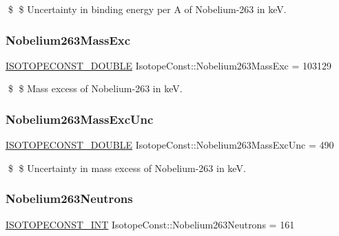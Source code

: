 \$ \$ Uncertainty in binding energy per A of Nobelium-\/263 in keV. \mbox{\label{group___isotope_const-_nobelium-_no263_ga46fcd33c52aae803cac7c14f2fa99e83}} 
\subsubsection{\texorpdfstring{Nobelium263\+Mass\+Exc}{Nobelium263MassExc}}
{\footnotesize\ttfamily \mbox{\hyperlink{group___isotope_const-_macros_ga8f45a7272ce02c0b4c65c44636ed719a}{I\+S\+O\+T\+O\+P\+E\+C\+O\+N\+S\+T\+\_\+\+D\+O\+U\+B\+LE}} Isotope\+Const\+::\+Nobelium263\+Mass\+Exc = 103129}

\$ \$ Mass excess of Nobelium-\/263 in keV. \mbox{\label{group___isotope_const-_nobelium-_no263_ga64a7565dba4a6623602af4562fa977e1}} 
\subsubsection{\texorpdfstring{Nobelium263\+Mass\+Exc\+Unc}{Nobelium263MassExcUnc}}
{\footnotesize\ttfamily \mbox{\hyperlink{group___isotope_const-_macros_ga8f45a7272ce02c0b4c65c44636ed719a}{I\+S\+O\+T\+O\+P\+E\+C\+O\+N\+S\+T\+\_\+\+D\+O\+U\+B\+LE}} Isotope\+Const\+::\+Nobelium263\+Mass\+Exc\+Unc = 490}

\$ \$ Uncertainty in mass excess of Nobelium-\/263 in keV. \mbox{\label{group___isotope_const-_nobelium-_no263_gaed4156afb538ce2c36378a25ada4008c}} 
\subsubsection{\texorpdfstring{Nobelium263\+Neutrons}{Nobelium263Neutrons}}
{\footnotesize\ttfamily \mbox{\hyperlink{group___isotope_const-_macros_ga5f18360b3e99483a35c32d789e62621c}{I\+S\+O\+T\+O\+P\+E\+C\+O\+N\+S\+T\+\_\+\+I\+NT}} Isotope\+Const\+::\+Nobelium263\+Neutrons = 161}

